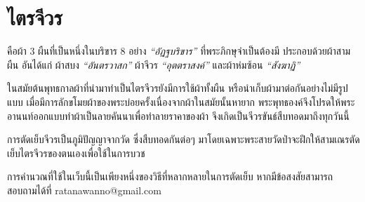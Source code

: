 \chapter{ไตรจีวร}

คือผ้า 3 ผืนที่เป็นหนึ่งในบริขาร 8 อย่าง \emph{``อัฏฐบริขาร''}
ที่พระภิกษุจำเป็นต้องมี ประกอบด้วยผ้าสามผืน อันได้แก่ ผ้าสบง
\emph{``อันตรวาสก''} ผ้าจีวร \emph{``อุตตราสงค์''} และผ้าห่มซ้อน
\emph{``สังฆาฏิ''}

ในสมัยต้นพุทธกาลผ้าที่นำมาทำเป็นไตรจีวรยังมีการใช้ผ้าทั้งผืน
หรือนำเก็บผ้ามาต่อกันอย่างไม่มีรูปแบบ
เมื่อมีการลักขโมยผ้าของพระบ่อยครั้งเนื่องจากผ้าในสมัยนั้นหายาก
พระพุทธองค์จึงโปรดให้พระอานนท์ออกแบบทำผ้าเป็นลายคันนาเพื่อทำลายราคาของผ้า
จึงเกิดเป็นจีวรขันธ์สืบทอดมาถึงทุกวันนี้

การตัดเย็บจีวรเป็นภูมิปัญญาจากวัด ซึ่งสืบทอดกันต่อๆ
มาโดยเฉพาะพระสายวัดป่าจะฝึกให้สามเณรตัดเย็บไตรจีวรของตนเองเพื่อใช้ในการบวช

การคำนวณที่ใช้ในเว็บนี้เป็นเพียงหนึ่งของวิธีที่หลากหลายในการตัดเย็บ
หากมีข้อสงสัยสามารถสอบถามได้ที่ ratanawanno@gmail.com

